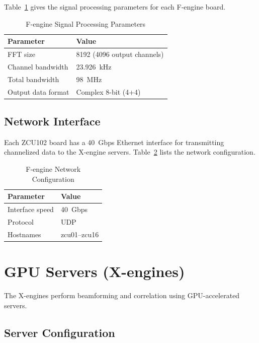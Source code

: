 Table~\ref{tab:fengine-params} gives the signal processing parameters for each F-engine board.

\begin{table}[htbp]
    \centering
    \caption{F-engine Signal Processing Parameters}
    \label{tab:fengine-params}
    \begin{tabular}{ll}
        \toprule
        \textbf{Parameter} & \textbf{Value} \\
        \midrule
        FFT size & 8192 (4096 output channels) \\
        Channel bandwidth & 23.926~kHz \\
        Total bandwidth & 98~MHz \\
        Output data format & Complex 8-bit (4+4) \\
        \bottomrule
    \end{tabular}
\end{table}

\subsection{Network Interface}

Each ZCU102 board has a 40~Gbps Ethernet interface for transmitting channelized data to the X-engine servers.  Table~\ref{tab:fengine-network} lists the network configuration.

\begin{table}[htbp]
    \centering
    \caption{F-engine Network Configuration}
    \label{tab:fengine-network}
    \begin{tabular}{ll}
        \toprule
        \textbf{Parameter} & \textbf{Value} \\
        \midrule
        Interface speed & 40~Gbps \\
        Protocol & UDP \\
        Hostnames & zcu01--zcu16 \\
        \bottomrule
    \end{tabular}
\end{table}

\section{GPU Servers (X-engines)}

The X-engines perform beamforming and correlation using GPU-accelerated servers.

\subsection{Server Configuration}

